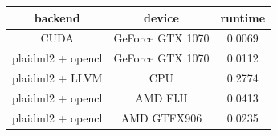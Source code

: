 \documentclass[9pt,twocolumn,twoside,notitlepage]{article}
\begin{document}
\begin{table}[htbp]
\centering
\begin{tabular}{ccc}
\hline
backend & device & runtime \\
\hline
CUDA  & GeForce GTX 1070  & 0.0069 \\
plaidml2 + opencl & GeForce GTX 1070 & 0.0112 \\
plaidml2 + LLVM  & CPU & 0.2774 \\
plaidml2 + opencl & AMD FIJI & 0.0413 \\
plaidml2 + opencl & AMD GTFX906 & 0.0235\\
\hline
\end{tabular}
  \label{tab:shapefunctions}
\end{table}
\end{document}
